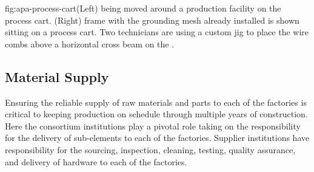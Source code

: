 \begin{dunefigure}{fig:apa-process-cart}{(Left)  being moved around a production facility on the process cart. (Right)  frame with the grounding mesh already installed is shown sitting on a process cart.  Two technicians are using a custom jig to place the wire combs above a horizontal cross beam on the .}
\setlength{\fboxsep}{0pt}
\setlength{\fboxrule}{0.5pt}
\end{dunefigure}

\subsection{Material Supply}  

Ensuring the reliable supply of raw materials and parts to each of the factories is critical to keeping  production on schedule through multiple years of construction. Here the consortium institutions play a pivotal role taking on the responsibility for the delivery of  sub-elements to each of the factories. Supplier institutions have responsibility for the sourcing, inspection, cleaning, testing, quality assurance, and delivery of hardware to each of the factories. 

